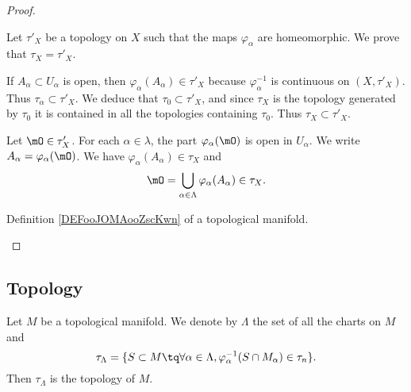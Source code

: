 \begin{proof}
\begin{subproof}
		Let \( \tau'_X\) be a topology on \( X\) such that the maps \( \varphi_{\alpha}\) are homeomorphic. We prove that \( \tau_X=\tau'_X\).
		\begin{subproof}
			If \( A_{\alpha}\subset U_{\alpha}\) is open, then \( \varphi_{\alpha}(A_{\alpha})\in\tau'_X\) because \( \varphi_{\alpha}^{-1}\) is continuous on \( (X,\tau'_X)\). Thus \( \tau_{\alpha}\subset\tau'_X\). We deduce that \( \tau_0\subset\tau'_X\), and since \( \tau_X\) is the topology generated by \( \tau_0\) it is contained in all the topologies containing \( \tau_0\). Thus \( \tau_X\subset\tau'_X\).

			Let \( \mO\in\tau'_X\). For each \( \alpha\in\lambda\), the part \( \varphi_{\alpha}(\mO)\) is open in \( U_{\alpha}\). We write \( A_{\alpha}=\varphi_{\alpha}(\mO)\). We have \( \varphi_{\alpha}(A_{\alpha})\in\tau_X\) and
			\begin{equation}
				\mO=\bigcup_{\alpha\in\Lambda}\varphi_{\alpha}(A_{\alpha})\in\tau_X.
			\end{equation}
		\end{subproof}


		Definition \ref{DEFooJOMAooZscKwn} of a topological manifold.

	\end{subproof}
\end{proof}

\subsection{Topology}


\begin{proposition}		\label{PROPooDEVUooCATTZI}
	Let \( M\) be a topological manifold. We denote by \( \Lambda\) the set of all the charts on \( M\) and
	\begin{equation}
		\tau_{\Lambda}=\{ S\subset M\tq \forall \alpha\in\Lambda,\varphi_{\alpha}^{-1}(S\cap M_{\alpha})\in\tau_n \}.
	\end{equation}
	Then \( \tau_{\Lambda}\) is the topology of \( M\).
\end{proposition}


